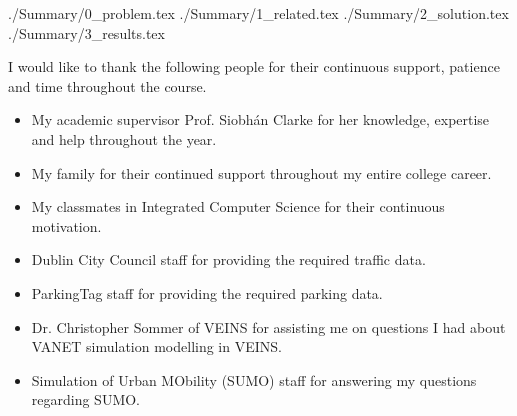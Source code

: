 \documentclass[a4paper, 11pt, oneside]{report}
\begin{document}
\thesistitlepage
\thesisdeclarationpage

\begin{thesissummary}
{./Summary/0_problem.tex}
{./Summary/1_related.tex}
{./Summary/2_solution.tex}
{./Summary/3_results.tex}
\end{thesissummary}

\begin{thesisabstract}
\end{thesisabstract}

\begin{thesisacknowledgments}
I would like to thank the following people for their continuous support, patience and time throughout the course.
\begin{itemize}
    \setlength\itemsep{0em}
    \item My academic supervisor Prof. Siobhán Clarke for her knowledge, expertise and help throughout the year.
    \item My family for their continued support throughout my entire college career.
    \item My classmates in Integrated Computer Science for their continuous motivation.
    \item Dublin City Council staff for providing the required traffic data.
    \item ParkingTag staff for providing the required parking data.
    \item Dr. Christopher Sommer of VEINS for assisting me on questions I had about \ac{VANET} simulation modelling in VEINS.
    \item Simulation of Urban MObility (SUMO) staff for answering my questions regarding SUMO.
\end{itemize}
\end{thesisacknowledgments}

\pagebreak

\tableofcontents                                  %
\listoftables                                     %
\listoffigures                                    %

\pagebreak

\end{document}
